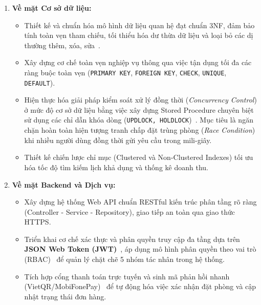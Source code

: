 \begin{enumerate}[leftmargin=2em]
    \item \textbf{Về mặt Cơ sở dữ liệu:}
    \begin{itemize}
        \item Thiết kế và chuẩn hóa mô hình dữ liệu quan hệ đạt chuẩn 3NF, đảm bảo tính toàn vẹn tham chiếu, tối thiểu hóa dư thừa dữ liệu và loại bỏ các dị thường thêm, xóa, sửa~\cite{silberschatz2020database}.
        \item Xây dựng cơ chế toàn vẹn nghiệp vụ thông qua việc tận dụng tối đa các ràng buộc toàn vẹn (\texttt{PRIMARY KEY}, \texttt{FOREIGN KEY}, \texttt{CHECK}, \texttt{UNIQUE}, \texttt{DEFAULT}).
        \item Hiện thực hóa giải pháp kiểm soát xử lý đồng thời (\textit{Concurrency Control}) ở mức độ cơ sở dữ liệu bằng việc xây dựng Stored Procedure chuyên biệt sử dụng các chỉ dẫn khóa dòng (\texttt{UPDLOCK, HOLDLOCK})~\cite{habibi2024towards, microsoft2024locking}. Mục tiêu là ngăn chặn hoàn toàn hiện tượng tranh chấp đặt trùng phòng (\textit{Race Condition}) khi nhiều người dùng đồng thời gửi yêu cầu trong mili-giây.
        \item Thiết kế chiến lược chỉ mục (Clustered và Non-Clustered Indexes) tối ưu hóa tốc độ tìm kiếm lịch khả dụng và thống kê doanh thu.
    \end{itemize}

    \item \textbf{Về mặt Backend và Dịch vụ:}
    \begin{itemize}
        \item Xây dựng hệ thống Web API chuẩn RESTful kiến trúc phân tầng rõ ràng (Controller - Service - Repository), giao tiếp an toàn qua giao thức HTTPS.
        \item Triển khai cơ chế xác thực và phân quyền truy cập đa tầng dựa trên \textbf{JSON Web Token (JWT)}~\cite{nugraha2023performance}, áp dụng mô hình phân quyền theo vai trò (RBAC)~\cite{sandhu2023role} để quản lý chặt chẽ 5 nhóm tác nhân trong hệ thống.
        \item Tích hợp cổng thanh toán trực tuyến và sinh mã phản hồi nhanh (VietQR/MobiFonePay)~\cite{wicaksono2023utilizing, sbv2021vietqr} để tự động hóa việc xác nhận đặt phòng và cập nhật trạng thái đơn hàng.
    \end{itemize}


\end{enumerate}
